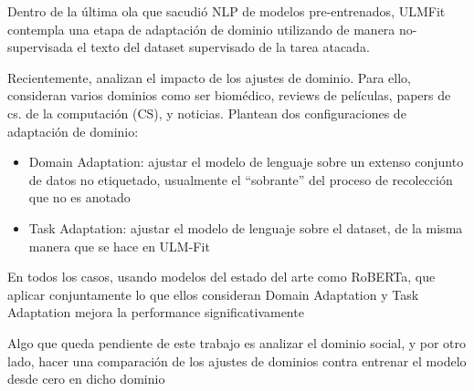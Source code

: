 Dentro de la última ola que sacudió NLP de modelos pre-entrenados, ULMFit \citet{howard-ruder-2018-universal} contempla una etapa de adaptación de dominio utilizando de manera no-supervisada el texto del dataset supervisado de la tarea atacada.

Recientemente, \citet{gururangan-etal-2020-dont} analizan el impacto de los ajustes de dominio. Para ello, consideran varios dominios como ser biomédico, reviews de películas, papers de cs. de la computación (CS), y noticias. Plantean dos configuraciones de adaptación de dominio:

\begin{itemize}
    \item Domain Adaptation: ajustar el modelo de lenguaje sobre un extenso conjunto de datos no etiquetado, usualmente el ``sobrante'' del proceso de recolección que no es anotado
    \item Task Adaptation: ajustar el modelo de lenguaje sobre el dataset, de la misma manera que se hace en ULM-Fit
\end{itemize}

En todos los casos, usando modelos del estado del arte como RoBERTa, que aplicar conjuntamente lo que ellos consideran Domain Adaptation y Task Adaptation mejora la performance significativamente


Algo que queda pendiente de este trabajo es analizar el dominio social, y por otro lado, hacer una comparación de los ajustes de dominios contra entrenar el modelo desde cero en dicho dominio
